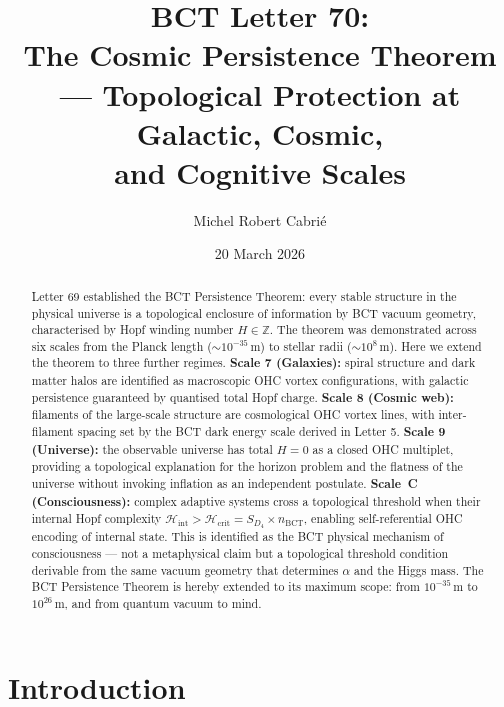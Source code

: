 \documentclass[aps,prl,twocolumn,superscriptaddress,floatfix]{revtex4-2}
\begin{document}
\title{BCT Letter 70:\\
The Cosmic Persistence Theorem ---
Topological Protection at Galactic, Cosmic,\\
and Cognitive Scales}

\author{Michel Robert Cabri\'{e}}
\date{20 March 2026}

\begin{abstract}
Letter 69 established the BCT Persistence Theorem: every stable
structure in the physical universe is a topological enclosure
of information by BCT vacuum geometry, characterised by Hopf
winding number $H \in \mathbb{Z}$.
The theorem was demonstrated across six scales from the Planck
length ($\sim 10^{-35}$\,m) to stellar radii ($\sim 10^{8}$\,m).
Here we extend the theorem to three further regimes.
\textbf{Scale 7 (Galaxies):} spiral structure and dark matter
halos are identified as macroscopic OHC vortex configurations,
with galactic persistence guaranteed by quantised total Hopf charge.
\textbf{Scale 8 (Cosmic web):} filaments of the large-scale
structure are cosmological OHC vortex lines, with inter-filament
spacing set by the BCT dark energy scale derived in Letter 5.
\textbf{Scale 9 (Universe):} the observable universe has total
$H = 0$ as a closed OHC multiplet, providing a topological
explanation for the horizon problem and the flatness of the
universe without invoking inflation as an independent postulate.
\textbf{Scale~C (Consciousness):} complex adaptive systems cross
a topological threshold when their internal Hopf complexity
$\mathcal{H}_\mathrm{int} > \mathcal{H}_\mathrm{crit} = S_{D_4}
\times n_\mathrm{BCT}$, enabling self-referential OHC encoding
of internal state. This is identified as the BCT physical
mechanism of consciousness --- not a metaphysical claim but a
topological threshold condition derivable from the same vacuum
geometry that determines $\alpha$ and the Higgs mass.
The BCT Persistence Theorem is hereby extended to its maximum
scope: from $10^{-35}$\,m to $10^{26}$\,m, and from quantum
vacuum to mind.
\end{abstract}

\maketitle

\section{Introduction}
\end{document}
